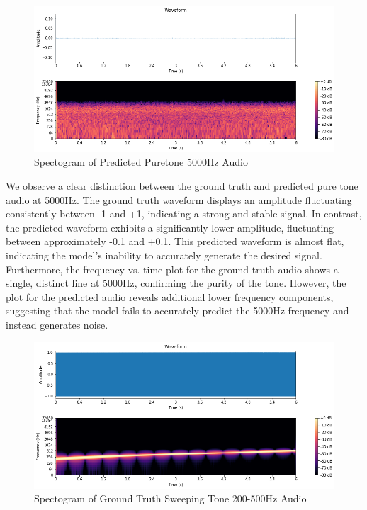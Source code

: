 \documentclass{ioereport}
\begin{document}
    \begin{figure}[H]
        \centering
        \includegraphics[width=\linewidth]{assets/audio_results/puretone5000hzpred.png}
        \caption{Spectogram of Predicted Puretone 5000Hz Audio}
        \label{fig:pred-pure5000-spec}
    \end{figure}

    We observe a clear distinction between the ground truth and predicted pure tone audio at 5000Hz. The ground truth waveform displays an amplitude fluctuating consistently between -1 and +1, indicating a strong and stable signal. In contrast, the predicted waveform exhibits a significantly lower amplitude, fluctuating between approximately -0.1 and +0.1. This predicted waveform is almost flat, indicating the model's inability to accurately generate the desired signal. Furthermore, the frequency vs. time plot for the ground truth audio shows a single, distinct line at 5000Hz, confirming the purity of the tone. However, the plot for the predicted audio reveals additional lower frequency components, suggesting that the model fails to accurately predict the 5000Hz frequency and instead generates noise.

    \begin{figure}[H]
        \centering
        \includegraphics[width=\linewidth]{assets/audio_results/sweeping_tone200-500hz.png}
        \caption{Spectogram of Ground Truth Sweeping Tone 200-500Hz Audio}
        \label{fig:gt-sweep200-500-spec}
    \end{figure}
    
\end{document}
